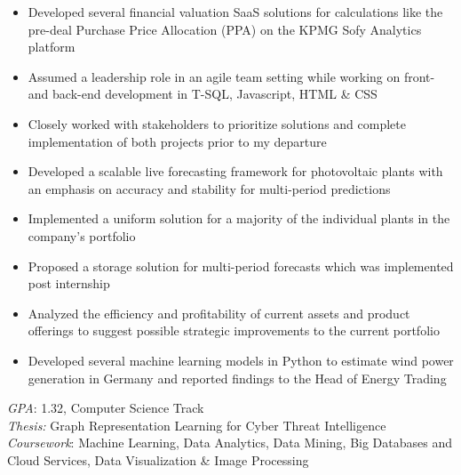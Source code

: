 \documentclass[9pt,a4paper,ragged2e]{altacv}
\begin{document}
    \begin{itemize}
        \item Developed several financial valuation SaaS solutions for calculations like the pre-deal Purchase Price Allocation (PPA) on the KPMG Sofy Analytics platform
        \item Assumed a leadership role in an agile team setting while working on front- and back-end development in T-SQL, Javascript, HTML \& CSS
        \item Closely worked with stakeholders to prioritize solutions and complete implementation of both projects prior to my departure
    \end{itemize}

    \divider

    \begin{itemize}
        \item Developed a scalable live forecasting framework for photovoltaic plants with an emphasis on accuracy and stability for multi-period predictions
        \item Implemented a uniform solution for a majority of the individual plants in the company's portfolio
        \item Proposed a storage solution for multi-period forecasts which was implemented post internship
    \end{itemize}

    \divider

    \begin{itemize}
        \item Analyzed the efficiency and profitability of current assets and product offerings to suggest possible strategic improvements to the current portfolio
        \item Developed several machine learning models in Python to estimate wind power generation in Germany and reported findings to the Head of Energy Trading
    \end{itemize}

    \medskip


    \textit{GPA}: 1.32,  Computer Science Track \\%
    \textit{Thesis:} Graph Representation Learning for Cyber Threat Intelligence\\
    \textit{Coursework}: Machine Learning, Data Analytics, Data Mining, Big Databases and Cloud Services, Data Visualization \& Image Processing
\end{document}
